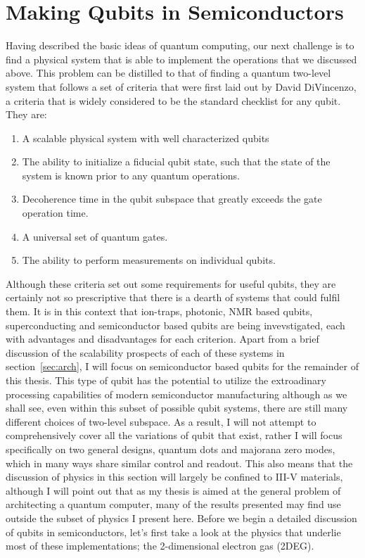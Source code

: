 \section{Making Qubits in Semiconductors}
\label{sec:qcinsm}
Having described the basic ideas of quantum computing, our next challenge is to find a physical system that
is able to implement the operations that we discussed above. This problem can be distilled to that
of finding a quantum two-level system that follows a set of criteria that were first laid out by David
DiVincenzo, a criteria that is widely considered to be the standard checklist for any qubit\cite{divincenzo_crit}. They are:
\begin{enumerate}
  \item A scalable physical system with well characterized qubits
  \item The ability to initialize a fiducial qubit state, such that the state of the system is known prior 
    to any quantum operations.
  \item Decoherence time in the qubit subspace that greatly exceeds the gate operation time.
  \item A universal set of quantum gates.
  \item The ability to perform measurements on individual qubits.
\end{enumerate}
Although these criteria set out some requirements for useful qubits, they are certainly not so prescriptive
that there is a dearth of systems that could fulfil them. It is in this context that ion-traps, photonic, 
NMR based qubits, superconducting and semiconductor based qubits are being invevstigated, each with advantages 
and disadvantages for each criterion. Apart from a brief discussion of the scalability prospects of each of these systems
in section~\ref{sec:arch}, I will focus on semiconductor based qubits for the remainder of this thesis. This type
of qubit has the potential to utilize the extroadinary processing capabilities of modern semiconductor manufacturing
although as we shall see, even within this subset of possible qubit systems, there are still many different
choices of two-level subspace. As a result, I will not attempt to comprehensively cover all the variations
of qubit that exist, rather I will focus specifically on two general designs, quantum dots and majorana zero modes,
which in many ways share similar control and readout. This also means that the discussion of physics in this section will
largely be confined to III-V materials, although I will point out that as my thesis is aimed at the general
problem of architecting a quantum computer, many of the results presented may find use outside the subset of physics
I present here. Before we begin a detailed discussion of qubits in semiconductors, let's first take a look 
at the physics that underlie most of these implementations; the 2-dimensional electron gas (2DEG).

